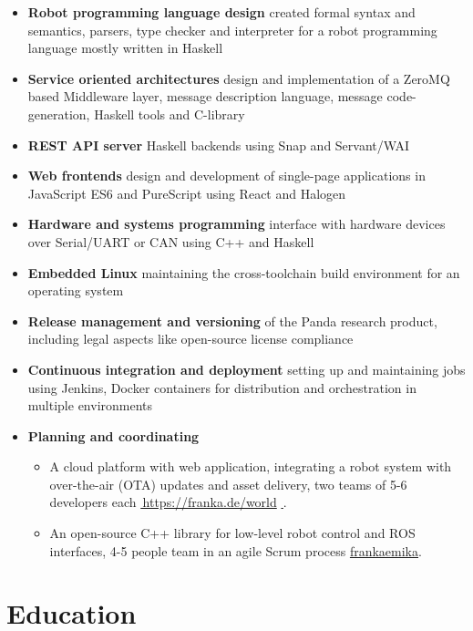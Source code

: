 \documentclass[11pt,a4paper,sans]{moderncv}
\renewcommand*{\link}[2][]{%
  \ifthenelse{\equal{#1}{}}%
    {\href{#2}{\color{link}\faExternalLink*\,#2}}%
    {\href{#2}{\color{link}\faExternalLink*\,#1}}}
\newcommand*{\githublink}[1]{\href{https://github.com/#1}{\color{link}\githubsocialsymbol#1}}%
\begin{document}
\begin{itemize}
\setlength\itemsep{0.5em}
\item \textbf{Robot programming language design} created formal syntax and semantics, parsers, type checker and interpreter for a robot programming language mostly written in Haskell
\item \textbf{Service oriented architectures} design and implementation of a ZeroMQ based Middleware layer, message description language, message code-generation, Haskell tools and C-library
\item \textbf{REST API server} Haskell backends using Snap and Servant/WAI
\item \textbf{Web frontends} design and development of single-page applications in JavaScript ES6 and PureScript using React and Halogen
\item \textbf{Hardware and systems programming} interface with hardware devices over Serial/UART or CAN using C++ and Haskell 
\item \textbf{Embedded Linux} maintaining the cross-toolchain build environment for an operating system
\item \textbf{Release management and versioning} of the Panda research product, including legal aspects like open-source license compliance
\item \textbf{Continuous integration and deployment} setting up and maintaining jobs using Jenkins, Docker containers for distribution and orchestration in multiple environments
\item \textbf{Planning and coordinating}
  \begin{itemize}
  \item A cloud platform with web application, integrating a robot system with
    over-the-air (OTA) updates and asset delivery, two teams of 5-6 developers
    each \link{https://franka.de/world}.
  \item An open-source C++ library for low-level robot control and ROS interfaces, 4-5 people team in an agile Scrum process \mbox{\githublink{frankaemika}}.
  \end{itemize}
\end{itemize}

\section{Education}
\end{document}
